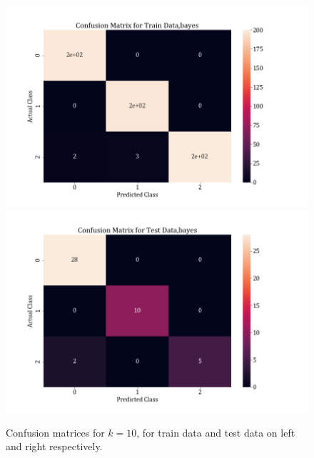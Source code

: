 \documentclass[11pt,a4paper]{article}
\begin{document}
\begin{figure}[H]
    \centering
    \includegraphics[scale=0.7]{images/1b_conf_mat_nb_train.png}
    \includegraphics[scale=0.7]{images/1b_conf_mat_nb_test.png}
    \caption{Confusion matrices for $k=10$, for train data and test data on left and right respectively.}
    \label{fig:1b_cm_nb}
\end{figure}
\end{document}
